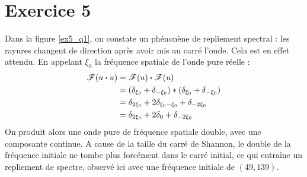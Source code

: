 \documentclass[12pt,a4paper,onecolumn]{article}
\begin{document}
\section*{Exercice 5}

Dans la figure \ref{ex5_q1}, on constate un phénonène de repliement spectral : les rayures changent de direction après avoir mis au carré l'onde. Cela est en effet attendu. En appelant $\xi_0$ la fréquence spatiale de l'onde pure réelle :
\begin{align*}
	\mathscr{F}(u \dotproduct u) & = \mathscr{F}(u) \dotproduct \mathscr{F}(u)                               \\
	                             & = (\delta_{\xi_0} + \delta_{-\xi_0}) * (\delta_{\xi_0} + \delta_{-\xi_0}) \\
	                             & = \delta_{2\xi_0} + 2\delta_{\xi_0 - \xi_0} + \delta_{-2\xi_0}            \\
	                             & = \delta_{2\xi_0} +  2\delta_0 + \delta_{-2\xi_0}
\end{align*}
On produit alors une onde pure de fréquence spatiale double, avec une composante continue. A cause de la taille du carré de Shannon, le double de la fréquence initiale ne tombe plus forcément dans le carré initial, ce qui entraîne un repliement de spectre, observé ici avec une fréquence initiale de $(49, 139)$.
\end{document}
